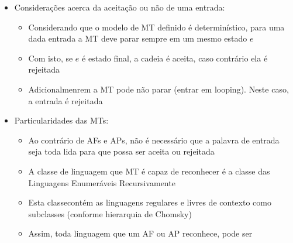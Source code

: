 \documentclass[12pt]{article}
\begin{document}
\begin{itemize}
\begin{itemize}
\begin{itemize}
        \end{itemize}
        \item Adicionalmente, pode-se estender as notações:
        \begin{itemize}
            \item $\vdash ^n$: quando através da aplicação de um número $n$ 
            (conhecido) de funções uma configuração leva a outra
            \begin{itemize}
                \item $[S_0,\langle\underline{1}010] \vdash^1 
                   [S_0,\langle0\underline{0}10]$
                \item $[S_0,\langle\underline{1}010] \vdash^{10} 
                   [S_f,\langle\underline{0}101]$
            \end{itemize}
            \item $\vdash ^*$: quando através da aplicação $n$ funções (com 
            $n\geq 0$) uma configuração pode leva a outra
        \end{itemize}
    \end{itemize}
    \item Considerações acerca da aceitação ou não de uma entrada:
    \begin{itemize}
        \item Considerando que o modelo de MT definido é determinístico, para 
        uma dada entrada a MT deve parar sempre em um mesmo estado $e$
        \item Com isto, se $e$ é estado final, a cadeia é aceita, caso contrário 
        ela é rejeitada
        \item Adicionalmenrem a MT pode não parar (entrar em looping). Neste 
        caso, a entrada é rejeitada
    \end{itemize}
    \item Particularidades das MTs:
    \begin{itemize}
        \item Ao contrário de AFs e APs, não é necessário que a palavra de 
        entrada seja toda lida para que possa ser aceita ou rejeitada
        \item A classe de linguagem que MT é capaz de reconhecer é a classe das 
        Linguagens Enumeráveis Recursivamente
        \item Esta classecontém as linguagens regulares e livres de contexto 
        como subclasses (conforme hierarquia de Chomsky)
        \item Assim, toda linguagem que um AF ou AP reconhece, pode ser 

\end{itemize}
\end{itemize}
\end{document}

